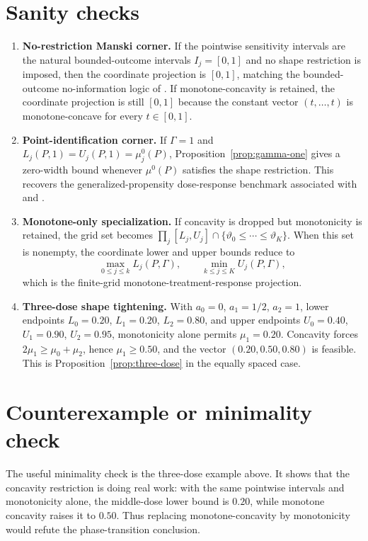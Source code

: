 \documentclass[11pt]{article}
\theoremstyle{definition}
\theoremstyle{plain}
\theoremstyle{remark}
\begin{document}
\section{Sanity checks}
\begin{enumerate}[leftmargin=2em]
\item \textbf{No-restriction Manski corner.}  If the pointwise sensitivity intervals are the natural bounded-outcome intervals \(I_j=[0,1]\) and no shape restriction is imposed, then the coordinate projection is \([0,1]\), matching the bounded-outcome no-information logic of \cite{Manski1990}.  If monotone-concavity is retained, the coordinate projection is still \([0,1]\) because the constant vector \((t,\ldots,t)\) is monotone-concave for every \(t\in[0,1]\).
\item \textbf{Point-identification corner.}  If \(\Gamma=1\) and \(L_j(P,1)=U_j(P,1)=\mu_j^0(P)\), Proposition~\ref{prop:gamma-one} gives a zero-width bound whenever \(\mu^0(P)\) satisfies the shape restriction.  This recovers the generalized-propensity dose-response benchmark associated with \cite{Imbens2000} and \cite{HiranoImbens2004}.
\item \textbf{Monotone-only specialization.}  If concavity is dropped but monotonicity is retained, the grid set becomes \(\prod_j[L_j,U_j]\cap\{\vartheta_0\le\cdots\le\vartheta_K\}\).  When this set is nonempty, the coordinate lower and upper bounds reduce to
\[
  \max_{0\le j\le k} L_j(P,\Gamma),
  \qquad
  \min_{k\le j\le K} U_j(P,\Gamma),
\]
which is the finite-grid monotone-treatment-response projection.
\item \textbf{Three-dose shape tightening.}  With \(a_0=0\), \(a_1=1/2\), \(a_2=1\), lower endpoints \(L_0=0.20\), \(L_1=0.20\), \(L_2=0.80\), and upper endpoints \(U_0=0.40\), \(U_1=0.90\), \(U_2=0.95\), monotonicity alone permits \(\mu_1=0.20\).  Concavity forces \(2\mu_1\ge\mu_0+\mu_2\), hence \(\mu_1\ge0.50\), and the vector \((0.20,0.50,0.80)\) is feasible.  This is Proposition~\ref{prop:three-dose} in the equally spaced case.
\end{enumerate}

\section{Counterexample or minimality check}
The useful minimality check is the three-dose example above.  It shows that the concavity restriction is doing real work: with the same pointwise intervals and monotonicity alone, the middle-dose lower bound is \(0.20\), while monotone concavity raises it to \(0.50\).  Thus replacing monotone-concavity by monotonicity would refute the phase-transition conclusion.
\end{document}
